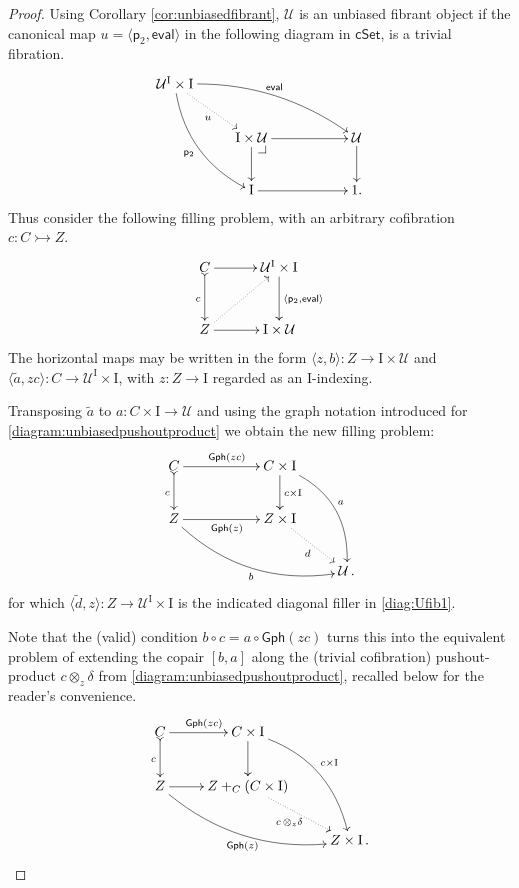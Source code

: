 \documentclass[12pt]{article}
\makeatletter
\newcommand{\cSet}{\ensuremath{\mathsf{cSet}}}
\newcommand{\proj}{\ensuremath{\mathsf{p}}}%
\newcommand{\ra}{\ensuremath{\rightarrow}}
\newcommand{\cof}{\ensuremath{\rightarrowtail}}
\renewcommand{\to}{\ensuremath{\rightarrow}}
\newcommand{\I}{\ensuremath{\mathrm{I}}}
\newcommand{\U}{\ensuremath{\mathcal{U}}}
\theoremstyle{remark}
\theoremstyle{definition}
\newcommand{\pbcorner}[1][dr]{\save*!/#1-1.2pc/#1:(-1,1)@^{|-}\restore}
\makeatother
\begin{document}
\begin{proof}
Using Corollary \ref{cor:unbiasedfibrant}, $\U$ is an unbiased fibrant object if the canonical map $u = \langle \proj_2, \mathsf{eval}\rangle$ in the following diagram in $\cSet$, is a trivial fibration.
\begin{equation}\label{diagram:Uunbiasedfibrant}
\xymatrix{
\U^\I\times \I \ar@/^3ex/ [rrrd]^{\mathsf{eval}} \ar@/_3ex/ [rdd]_{\proj_2} \ar@{..>}[rd]_{u}  && \\
& \I\times \U \pbcorner  \ar[d] \ar[rr] && \U \ar[d] \\
& \I \ar[rr] && 1.
}
\end{equation}
%
Thus consider the following filling problem, with an arbitrary cofibration $c:C \cof Z$.
\begin{equation}\label{diag:Ufib1}
\xymatrix@=3em{
C \ar@{>->}[d]_c \ar[r] & \U^\I\times \I \ar[d]^{\langle \proj_2, \mathsf{eval}\rangle} \\
Z  \ar@{..>}[ru] \ar[r]  & \I\times\U  \\
}
\end{equation}
%
The horizontal maps may be written in the form $\langle z, b\rangle : Z \to \I\times \U$ and $\langle \tilde{a} , zc\rangle : C \to \U^\I\times\I$, with $z : Z \to \I$ regarded as an $\I$-indexing.

Transposing $\tilde{a}$ to $a : C\times \I \ra \U$ and using the graph notation introduced for \eqref{diagram:unbiasedpushoutproduct} we obtain the new filling problem:
%
\begin{equation}\label{diagram:unbiasedpushoutproduct4}
\xymatrix{
C \ar@{>->}[d]_{c} \ar[rr]^{\mathsf{Gph}(zc)} && C\times \I \ar[d]^{c\times\I} \ar@/^4ex/ [rdd]^{a} \\
Z \ar@/_4ex/ [rrrd]_{b} \ar[rr]_{\mathsf{Gph}(z)} &&  Z\times\I  \ar@{.>}[rd]_{d} \\
&&& \U\,.
}
\end{equation}
for which $\langle \tilde{d} , z\rangle : Z \to \U^\I\times\I$ is the indicated diagonal filler in \eqref{diag:Ufib1}.

Note that the (valid) condition $b\circ c = a\circ \mathsf{Gph}(zc)$ turns this into the equivalent problem of extending the copair $[b,a]$ along the  (trivial cofibration) pushout-product ${c}\otimes_z\!{\delta}$ from \eqref{diagram:unbiasedpushoutproduct}, recalled below for the reader's convenience.
%
\begin{equation}\label{diagram:unbiasedpushoutproduct5}
\xymatrix{
C \ar@{>->}[d]_{c} \ar[r]^{\mathsf{Gph}(zc)} & C\times \I \ar[d] \ar@/^4ex/ [rdd]^{c\times\I}\\
Z \ar@/_4ex/ [rrd]_{\mathsf{Gph}(z)} \ar[r] &  Z +_C (C\times\I) \ar@{.>}[rd]_{c\, \otimes_z \delta} \\
&& Z\times\I\,.
}
\end{equation}


\end{proof}
\end{document}
